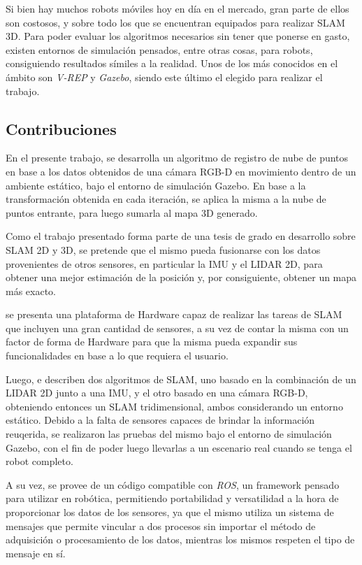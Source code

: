 Si bien hay muchos robots móviles hoy en día en el mercado, gran parte de ellos son costosos, y sobre todo los que se encuentran equipados para realizar SLAM 3D. Para poder evaluar los algoritmos necesarios sin tener que ponerse en gasto, existen entornos de simulación pensados, entre otras cosas, para robots, consiguiendo resultados símiles a la realidad. Unos de los más conocidos en el ámbito son \textit{V-REP} y \textit{Gazebo}, siendo este último el elegido para realizar el trabajo.

\subsection{Contribuciones}
En el presente trabajo, 
\ifimagenes
se desarrolla un algoritmo de registro de nube de puntos en base a los datos obtenidos de una cámara RGB-D en movimiento dentro de un ambiente estático, bajo el entorno de simulación Gazebo. En base a la transformación obtenida en cada iteración, se aplica la misma a la nube de puntos entrante, para luego sumarla al mapa 3D generado.

Como el trabajo presentado forma parte de una tesis de grado en desarrollo sobre SLAM 2D y 3D, se pretende que el mismo pueda fusionarse con los datos provenientes de otros sensores, en particular la IMU y el LIDAR 2D, para obtener una mejor estimación de la posición y, por consiguiente, obtener un mapa más exacto.

\else
se presenta una plataforma de Hardware capaz de realizar las tareas de SLAM que incluyen una gran cantidad de sensores, a su vez de contar la misma con un factor de forma de Hardware para que la misma pueda expandir sus funcionalidades en base a lo que requiera el usuario.

Luego, e describen dos algoritmos de SLAM, uno basado en la combinación de un LIDAR 2D junto a una IMU, y el otro basado en una cámara RGB-D, obteniendo entonces un SLAM tridimensional, ambos considerando un entorno estático. Debido a la falta de sensores capaces de brindar la información reuqerida, se realizaron las pruebas del mismo bajo el entorno de simulación Gazebo, con el fin de poder luego llevarlas a un escenario real cuando se tenga el robot completo.
\fi

A su vez, se provee de un código compatible con \textit{ROS}, un framework pensado para utilizar en robótica, permitiendo portabilidad y versatilidad a la hora de proporcionar los datos de los sensores, ya que el mismo utiliza un sistema de mensajes que permite vincular a dos procesos sin importar el método de adquisición o procesamiento de los datos, mientras los mismos respeten el tipo de mensaje en sí.

